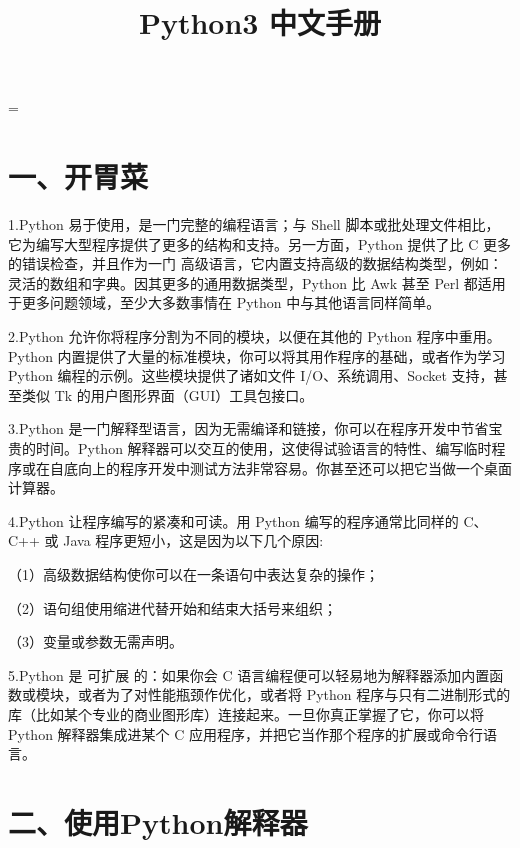 \documentclass{article}
\begin{document}
 
\hfuzz=\maxdimen
{}
\begin{CJK}{UTF8}{gbsn}  
\title{Python3 中文手册}
\author{}
\date{}
\maketitle
\part*{一、开胃菜}
\subparagraph*{}
1.Python 易于使用，是一门完整的编程语言；与 Shell 脚本或批处理文件相比，它为编写大型程序提供了更多的结构和支持。另一方面，Python 提供了比 C 更多的错误检查，并且作为一门 高级语言，它内置支持高级的数据结构类型，例如：灵活的数组和字典。因其更多的通用数据类型，Python 比 Awk 甚至 Perl 都适用于更多问题领域，至少大多数事情在 Python 中与其他语言同样简单。
\subparagraph*{}
2.Python 允许你将程序分割为不同的模块，以便在其他的 Python 程序中重用。Python 内置提供了大量的标准模块，你可以将其用作程序的基础，或者作为学习 Python 编程的示例。这些模块提供了诸如文件 I/O、系统调用、Socket 支持，甚至类似 Tk 的用户图形界面（GUI）工具包接口。
\subparagraph*{}
3.Python 是一门解释型语言，因为无需编译和链接，你可以在程序开发中节省宝贵的时间。Python 解释器可以交互的使用，这使得试验语言的特性、编写临时程序或在自底向上的程序开发中测试方法非常容易。你甚至还可以把它当做一个桌面计算器。
\subparagraph*{}
4.Python 让程序编写的紧凑和可读。用 Python 编写的程序通常比同样的 C、C++ 或 Java 程序更短小，这是因为以下几个原因:
\subparagraph*{}
（1）高级数据结构使你可以在一条语句中表达复杂的操作；
\subparagraph*{}
（2）语句组使用缩进代替开始和结束大括号来组织；
\subparagraph*{}
（3）变量或参数无需声明。
\subparagraph*{}
5.Python 是 可扩展 的：如果你会 C 语言编程便可以轻易地为解释器添加内置函数或模块，或者为了对性能瓶颈作优化，或者将 Python 程序与只有二进制形式的库（比如某个专业的商业图形库）连接起来。一旦你真正掌握了它，你可以将 Python 解释器集成进某个 C 应用程序，并把它当作那个程序的扩展或命令行语言。
\part*{二、使用Python解释器}

\end{CJK}
\end{document}
